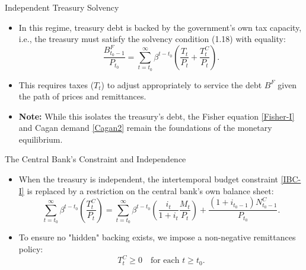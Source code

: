 \documentclass[11pt,aspectratio=169]{beamer}
\begin{document}
\begin{frame}{Independent Treasury Solvency}
\small


\begin{itemize}
    \item In this regime, treasury debt is backed by the government's own tax capacity, i.e., the treasury must satisfy the solvency condition (1.18) with equality:
    \begin{equation}
    \frac{B_{t_{0}-1}^{F}}{P_{t_{0}}} = \sum_{t=t_{0}}^{\infty }\beta ^{t-t_{0}}\left( \frac{T_{t}}{P_{t}}+\frac{T_{t}^{C}}{P_{t}}\right). \label{SolvenvyH}
    \end{equation}
    \item This requires taxes ($T_t$) to adjust appropriately to service the debt $B^F$ given the path of prices and remittances.
    \item \textbf{Note:} While this isolates the treasury's debt, the Fisher equation \eqref{Fisher-I} and Cagan demand \eqref{Cagan2} remain the foundations of the monetary equilibrium.
\end{itemize}
\end{frame}

\begin{frame}{The Central Bank's Constraint and Independence}
\small


\begin{itemize}
    \item When the treasury is independent, the intertemporal budget constraint \eqref{IBC-I} is replaced by a restriction on the central bank's own balance sheet:
    \begin{equation}
    \sum_{t=t_{0}}^{\infty }\beta ^{t-t_{0}}\left( \frac{T_{t}^{C}}{P_{t}}\right) = \sum_{t=t_{0}}^{\infty }\beta ^{t-t_{0}}\left( \frac{i_{t}}{1+i_{t}}\frac{M_{t}}{P_{t}}\right) + \frac{(1+i_{t_{0}-1})N_{t_{0}-1}^{C}}{P_{t_{0}}}. \label{Hyper-Central Bank}
    \end{equation}
 
    \item To ensure no "hidden" backing exists, we impose a non-negative remittances policy:
    \begin{equation*}
    T_{t}^{C} \geq 0 \quad \text{for each } t \geq t_{0}.
    \end{equation*}
\end{itemize}
\end{frame}
\end{document}

